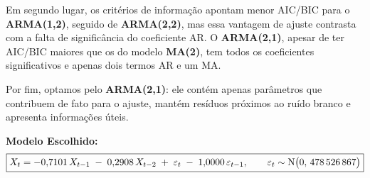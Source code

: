 \documentclass[
]{article}
\begin{document}
Em segundo lugar, os critérios de informação apontam menor AIC/BIC para
o \textbf{ARMA(1,2)}, seguido de \textbf{ARMA(2,2)}, mas essa vantagem
de ajuste contrasta com a falta de significância do coeficiente AR. O
\textbf{ARMA(2,1)}, apesar de ter AIC/BIC maiores que os do modelo
\textbf{MA(2)}, tem todos os coeficientes significativos e apenas dois
termos AR e um MA.

Por fim, optamos pelo \textbf{ARMA(2,1)}: ele contém apenas parâmetros
que contribuem de fato para o ajuste, mantém resíduos próximos ao ruído
branco e apresenta informações úteis.

\noindent\textbf{Modelo Escolhido:} \[
\boxed{%
X_t = -0{,}7101\,X_{t-1} \;-\; 0{,}2908\,X_{t-2}
\;+\;\varepsilon_t \;-\; 1{,}0000\,\varepsilon_{t-1},
\qquad
\varepsilon_t \sim \mathrm{N}\bigl(0,\,478\,526\,867\bigr)
}
\]
\end{document}
